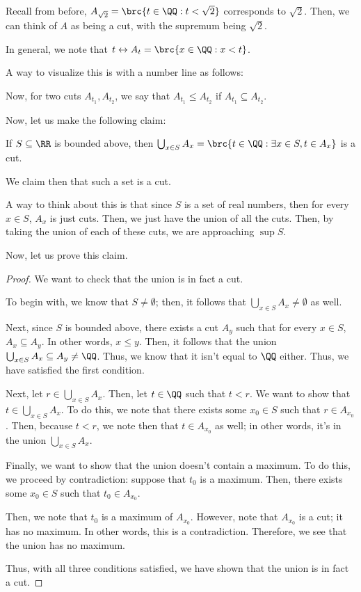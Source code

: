\documentclass[openany]{book}
\begin{document}
\begin{rmk}
	Recall from before, $A_{\sqrt{2}} = \brc{t \in \QQ : t < \sqrt{2}}$ corresponds to $\sqrt{2}$. Then, we can think of $A$ as being a cut, with the supremum being $\sqrt{2}$.
	
	In general, we note that $t \leftrightarrow A_t = \brc{x \in \QQ : x < t}$.
	
	A way to visualize this is with a number line as follows:
\end{rmk}

Now, for two cuts $A_{t_1}, A_{t_2}$, we say that $A_{t_1} \leq A_{t_2}$ if $A_{t_1} \subseteq A_{t_2}$.


Now, let us make the following claim:
\begin{prop}
	If $S \subseteq \RR$ is bounded above, then $\bigcup_{x \in S} A_x = \brc{t \in \QQ : \exists x \in S, t \in A_x}$ is a cut.
	
	We claim then that such a set is a cut.
\end{prop}

A way to think about this is that since $S$ is a set of real numbers, then for every $x \in S$, $A_x$ is just cuts. Then, we just have the union of all the cuts. Then, by taking the union of each of these cuts, we are approaching $\sup S$.

Now, let us prove this claim.
\begin{proof}
	We want to check that the union is in fact a cut.
	
	To begin with, we know that $S \neq \emptyset$; then, it follows that $\bigcup_{x \in S} A_x \neq \emptyset$ as well.
	
	Next, since $S$ is bounded above, there exists a cut $A_y$ such that for every $x \in S$, $A_x \subseteq A_y$. In other words, $x \leq y$. Then, it follows that the union $\bigcup_{x \in S} A_x \subseteq A_y \neq \QQ$. Thus, we know that it isn't equal to $\QQ$ either. Thus, we have satisfied the first condition.
	
	Next, let $r \in \bigcup_{x \in S} A_x$. Then, let $t \in \QQ$ such that $t < r$. We want to show that $t \in \bigcup_{x \in S} A_x$. To do this, we note that there exists some $x_0 \in S$ such that $r \in A_{x_0}$. Then, because $t < r$, we note then that $t \in A_{x_0}$ as well; in other words, it's in the union $\bigcup_{x \in S} A_x$.
	
	Finally, we want to show that the union doesn't contain a maximum. To do this, we proceed by contradiction: suppose that $t_0$ is a maximum. Then, there exists some $x_0 \in S$ such that $t_0 \in A_{x_0}$.
	
	Then, we note that $t_0$ is a maximum of $A_{x_0}$. However, note that $A_{x_0}$ is a cut; it has no maximum. In other words, this is a contradiction. Therefore, we see that the union has no maximum.
	
	Thus, with all three conditions satisfied, we have shown that the union is in fact a cut.
\end{proof}
\end{document}
